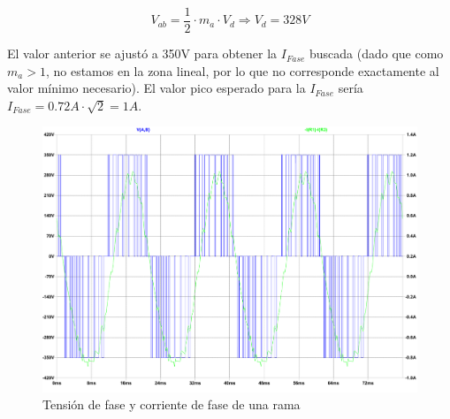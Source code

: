 \documentclass[e4_tp3_main.tex]{subfiles}
\begin{document}
\[
V_{ab} = \frac{1}{2} \cdot m_a \cdot V_d \Longrightarrow V_d = 328V
\]

El valor anterior se ajustó a 350V para obtener la $I_{Fase}$ buscada (dado que como $m_a > 1$, no estamos en la zona lineal, por lo que no corresponde exactamente al valor mínimo necesario). El valor pico esperado para la $I_{Fase}$ sería $I_{Fase} = 0.72A \cdot \sqrt{2} = 1A$.

\begin{figure}[H]
\centering
\includegraphics[width=0.9\linewidth]{Imagenes/motorTriangulo.pdf}
\caption{Tensión de fase y corriente de fase de una rama}
\end{figure}
\end{document}
